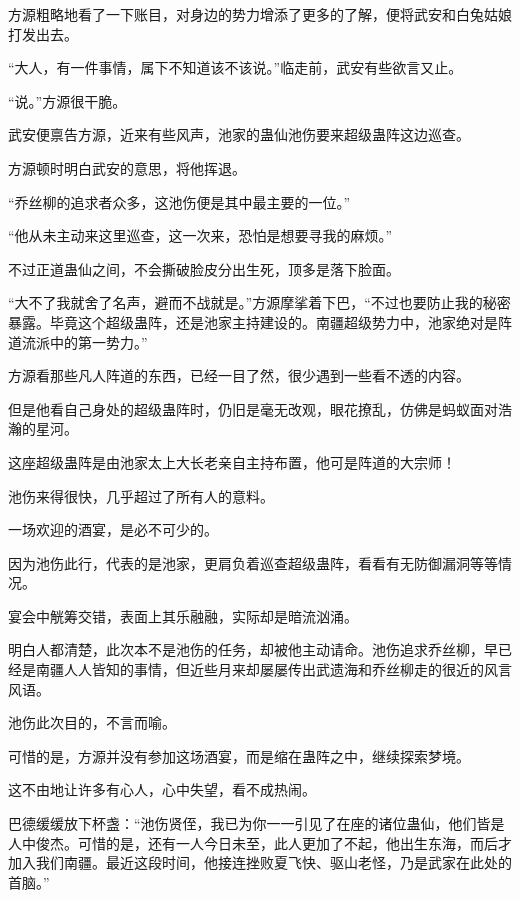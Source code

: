 
\begin{this_body}

方源粗略地看了一下账目，对身边的势力增添了更多的了解，便将武安和白兔姑娘打发出去。

“大人，有一件事情，属下不知道该不该说。”临走前，武安有些欲言又止。

“说。”方源很干脆。

武安便禀告方源，近来有些风声，池家的蛊仙池伤要来超级蛊阵这边巡查。

方源顿时明白武安的意思，将他挥退。

“乔丝柳的追求者众多，这池伤便是其中最主要的一位。”

“他从未主动来这里巡查，这一次来，恐怕是想要寻我的麻烦。”

不过正道蛊仙之间，不会撕破脸皮分出生死，顶多是落下脸面。

“大不了我就舍了名声，避而不战就是。”方源摩挲着下巴，“不过也要防止我的秘密暴露。毕竟这个超级蛊阵，还是池家主持建设的。南疆超级势力中，池家绝对是阵道流派中的第一势力。”

方源看那些凡人阵道的东西，已经一目了然，很少遇到一些看不透的内容。

但是他看自己身处的超级蛊阵时，仍旧是毫无改观，眼花撩乱，仿佛是蚂蚁面对浩瀚的星河。

这座超级蛊阵是由池家太上大长老亲自主持布置，他可是阵道的大宗师！

池伤来得很快，几乎超过了所有人的意料。

一场欢迎的酒宴，是必不可少的。

因为池伤此行，代表的是池家，更肩负着巡查超级蛊阵，看看有无防御漏洞等等情况。

宴会中觥筹交错，表面上其乐融融，实际却是暗流汹涌。

明白人都清楚，此次本不是池伤的任务，却被他主动请命。池伤追求乔丝柳，早已经是南疆人人皆知的事情，但近些月来却屡屡传出武遗海和乔丝柳走的很近的风言风语。

池伤此次目的，不言而喻。

可惜的是，方源并没有参加这场酒宴，而是缩在蛊阵之中，继续探索梦境。

这不由地让许多有心人，心中失望，看不成热闹。

巴德缓缓放下杯盏：“池伤贤侄，我已为你一一引见了在座的诸位蛊仙，他们皆是人中俊杰。可惜的是，还有一人今日未至，此人更加了不起，他出生东海，而后才加入我们南疆。最近这段时间，他接连挫败夏飞快、驱山老怪，乃是武家在此处的首脑。”


\end{this_body}

